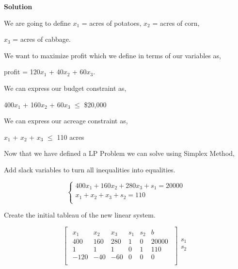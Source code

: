 \documentclass{article}
\begin{document}
\textbf{Solution}

\vspace{\baselineskip}

We are going to define $x_1$ = acres of potatoes, $x_2$ = acres of corn, 

$x_3$ = acres of cabbage.

\vspace{\baselineskip}

We want to maximize profit which we define in terms of our variables as, 


profit = 120$x_1$ + 40$x_2$ + 60$x_3$.

\vspace{\baselineskip}

We can express our budget constraint as,


400$x_1$ + 160$x_2$ + 60$x_3$ $\leq$ \$20,000

\vspace{\baselineskip}

We can express our acreage constraint as,


$x_1$ + $x_2$ + $x_3$ $\leq$ 110 acres

\vspace{\baselineskip}

Now that we have defined a LP Problem we can solve using Simplex Method,

\vspace{\baselineskip}

Add slack variables to turn all inequalities into equalities.


\[
\left\{
\begin{array}{l}
400x_1 + 160x_2 + 280x_3 + s_1 = 20000 \\
x_1 + x_2 + x_3 + s_2 = 110 \\
\end{array}
\right.
\]

\vspace{\baselineskip}

Create the initial tableau of the new linear system.

\begin{equation*}
\begin{bmatrix}
\begin{array}{ccccc|c}
x_1 & x_2 & x_3 & s_1 & s_2 & b \\
\hline
400 & 160 & 280 & 1 & 0 & 20000 \\
1 & 1 & 1 & 0 & 1 & 110 \\
\hline
-120 & -40 & -60 & 0 & 0 & 0 \\
\end{array}
\end{bmatrix}
\begin{array}{c}
\\
s_1 \\
s_2 \\
\\
\end{array}
\end{equation*}
\end{document}
